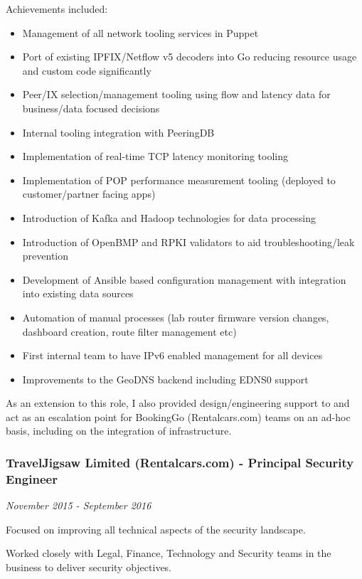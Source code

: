 Achievements included:

\begin{itemize}
\tightlist
\item
  Management of all network tooling services in Puppet
\item
  Port of existing IPFIX/Netflow v5 decoders into Go reducing resource
  usage and custom code significantly
\item
  Peer/IX selection/management tooling using flow and latency data for
  business/data focused decisions
\item
  Internal tooling integration with PeeringDB
\item
  Implementation of real-time TCP latency monitoring tooling
\item
  Implementation of POP performance measurement tooling (deployed to
  customer/partner facing apps)
\item
  Introduction of Kafka and Hadoop technologies for data processing
\item
  Introduction of OpenBMP and RPKI validators to aid
  troubleshooting/leak prevention
\item
  Development of Ansible based configuration management with integration
  into existing data sources
\item
  Automation of manual processes (lab router firmware version changes,
  dashboard creation, route filter management etc)
\item
  First internal team to have IPv6 enabled management for all devices
\item
  Improvements to the GeoDNS backend including EDNS0 support
\end{itemize}

As an extension to this role, I also provided design/engineering support
to and act as an escalation point for BookingGo (Rentalcars.com) teams
on an ad-hoc basis, including on the integration of infrastructure.

\subsubsection{TravelJigsaw Limited (Rentalcars.com) - Principal
Security
Engineer}\label{traveljigsaw-limited-rentalcars.com---principal-security-engineer}

\emph{November 2015 - September 2016}

Focused on improving all technical aspects of the security landscape.

Worked closely with Legal, Finance, Technology and Security teams in the
business to deliver security objectives.


